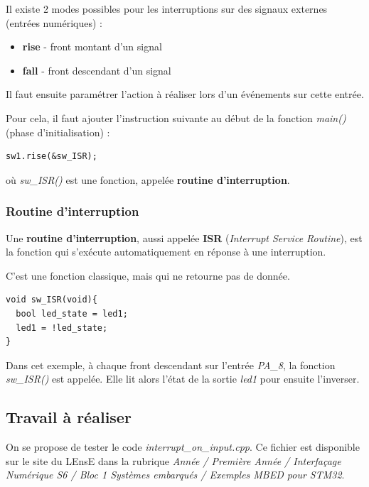 \documentclass[a4paper,11pt,titlepage]{article} %
\begin{document}
\medskip

Il existe 2 modes possibles pour les interruptions sur des signaux externes (entrées numériques) : 

\begin{itemize}
	\item \textbf{rise} - front montant d'un signal
	\item \textbf{fall} - front descendant d'un signal
\end{itemize}

\medskip

Il faut ensuite paramétrer l'action à réaliser lors d'un événements sur cette entrée.

Pour cela, il faut ajouter l'instruction suivante au début de la fonction \textsl{main()} (phase d'initialisation) :

\begin{lstlisting}
sw1.rise(&sw_ISR);
\end{lstlisting}

où \textsl{sw\_ISR()} est une fonction, appelée \textbf{routine d'interruption}.

\subsubsection{Routine d'interruption}

Une \textbf{routine d'interruption}, aussi appelée \textbf{ISR} (\textit{Interrupt Service Routine}), est la fonction qui s'exécute automatiquement en réponse à une interruption. 

C'est une fonction classique, mais qui ne retourne pas de donnée.

\begin{lstlisting}
void sw_ISR(void){
  bool led_state = led1;
  led1 = !led_state;
} 
\end{lstlisting}

Dans cet exemple, à chaque front descendant sur l'entrée \textsl{PA\_8}, la fonction \textsl{sw\_ISR()} est appelée. Elle lit alors l'état de la sortie \textsl{led1} pour ensuite l'inverser.

\subsection{Travail à réaliser}

On se propose de tester le code \textsl{interrupt\_on\_input.cpp}. Ce fichier est disponible sur le site du LEnsE dans la rubrique \textit{Année / Première Année / Interfaçage Numérique S6 / Bloc 1 Systèmes embarqués / Exemples MBED pour STM32}.
\end{document}
